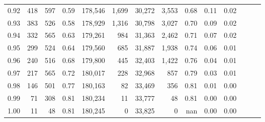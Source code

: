 \begin{tabular}{rrrrrrrrrrrrrr}
0.92 &    418 &  597 &  0.59 &  178,546 &    1,699 &  30,272 &   3,553 &  0.68 &  0.11 &      0.02 \\
0.93 &    383 &  526 &  0.58 &  178,929 &    1,316 &  30,798 &   3,027 &  0.70 &  0.09 &      0.02 \\
0.94 &    332 &  565 &  0.63 &  179,261 &      984 &  31,363 &   2,462 &  0.71 &  0.07 &      0.02 \\
0.95 &    299 &  524 &  0.64 &  179,560 &      685 &  31,887 &   1,938 &  0.74 &  0.06 &      0.01 \\
0.96 &    240 &  516 &  0.68 &  179,800 &      445 &  32,403 &   1,422 &  0.76 &  0.04 &      0.01 \\
0.97 &    217 &  565 &  0.72 &  180,017 &      228 &  32,968 &     857 &  0.79 &  0.03 &      0.01 \\
0.98 &    146 &  501 &  0.77 &  180,163 &       82 &  33,469 &     356 &  0.81 &  0.01 &      0.00 \\
0.99 &     71 &  308 &  0.81 &  180,234 &       11 &  33,777 &      48 &  0.81 &  0.00 &      0.00 \\
1.00 &     11 &   48 &  0.81 &  180,245 &        0 &  33,825 &       0 &   nan &  0.00 &      0.00 \\
\bottomrule
\end{tabular}
